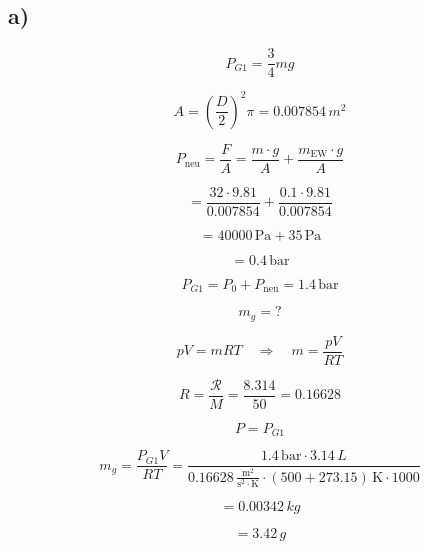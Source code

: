 

\subsection*{a)}

\[ P_{G1} = \frac{3}{4} mg \]

\[ A = \left( \frac{D}{2} \right)^2 \pi = 0.007854 \, m^2 \]

\[ P_{\text{neu}} = \frac{F}{A} = \frac{m \cdot g}{A} + \frac{m_{\text{EW}} \cdot g}{A} \]

\[ = \frac{32 \cdot 9.81}{0.007854} + \frac{0.1 \cdot 9.81}{0.007854} \]

\[ = 40000 \, \text{Pa} + 35 \, \text{Pa} \]

\[ = 0.4 \, \text{bar} \]

\[ P_{G1} = P_0 + P_{\text{neu}} = 1.4 \, \text{bar} \]

\[ m_g = ? \]

\[ pV = m R T \quad \Rightarrow \quad m = \frac{pV}{R T} \]

\[ R = \frac{\mathcal{R}}{M} = \frac{8.314}{50} = 0.16628 \]

\[ P = P_{G1} \]

\[ m_g = \frac{P_{G1} V}{R T} = \frac{1.4 \, \text{bar} \cdot 3.14 \, L}{0.16628 \, \frac{\text{m}^2}{\text{s}^2 \cdot \text{K}} \cdot (500 + 273.15) \, \text{K} \cdot 1000} \]

\[ = 0.00342 \, kg \]

\[ = 3.42 \, g \]